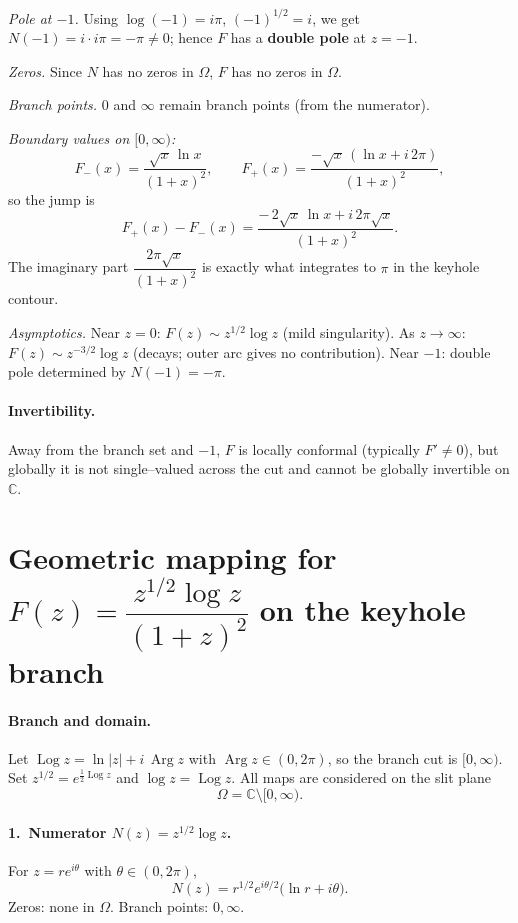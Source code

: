 \documentclass[12pt,a4paper]{article}
\DeclareMathOperator{\Arg}{Arg}
\DeclareMathOperator{\Log}{Log}
\newcommand{\C}{\mathbb{C}}
\begin{document}
\emph{Pole at \(-1\).}
Using \(\log(-1)=i\pi\), \((-1)^{1/2}=i\), we get \(N(-1)=i\cdot i\pi=-\pi\neq0\);
hence \(F\) has a \textbf{double pole} at \(z=-1\).

\emph{Zeros.}
Since \(N\) has no zeros in \(\Omega\), \(F\) has no zeros in \(\Omega\).

\emph{Branch points.}
\(0\) and \(\infty\) remain branch points (from the numerator).

\emph{Boundary values on \([0,\infty)\):}
\[
F_-(x)=\frac{\sqrt{x}\,\ln x}{(1+x)^2},\qquad
F_+(x)=\frac{-\sqrt{x}\,(\ln x+i\,2\pi)}{(1+x)^2},
\]
so the jump is
\[
F_+(x)-F_-(x)=\frac{-\,2\sqrt{x}\,\ln x+i\,2\pi\sqrt{x}}{(1+x)^2}.
\]
The imaginary part \( \dfrac{2\pi\sqrt{x}}{(1+x)^2}\) is exactly what integrates to \(\pi\) in the keyhole contour.

\emph{Asymptotics.}
Near \(z=0\): \(F(z)\sim z^{1/2}\log z\) (mild singularity).
As \(z\to\infty\): \(F(z)\sim z^{-3/2}\log z\) (decays; outer arc gives no contribution).
Near \(-1\): double pole determined by \(N(-1)=-\pi\).

\bigskip

\paragraph{Invertibility.}
Away from the branch set and \(-1\), \(F\) is locally conformal (typically \(F'\neq0\)),
but globally it is not single–valued across the cut and cannot be globally invertible on \(\C\).

\section*{Geometric mapping for \(F(z)=\dfrac{z^{1/2}\log z}{(1+z)^2}\) on the keyhole branch}

\paragraph{Branch and domain.}
Let \(\Log z=\ln|z|+i\,\Arg z\) with \(\Arg z\in(0,2\pi)\), so the branch cut is \([0,\infty)\).
Set \(z^{1/2}=e^{\frac12\Log z}\) and \(\log z=\Log z\).
All maps are considered on the slit plane
\[
\Omega=\C\setminus[0,\infty).
\]

\bigskip
\paragraph{1.\ Numerator \(N(z)=z^{1/2}\log z\).}
For \(z=re^{i\theta}\) with \(\theta\in(0,2\pi)\),
\[
N(z)=r^{1/2}e^{i\theta/2}\big(\ln r+i\theta\big).
\]
Zeros: none in \(\Omega\). Branch points: \(0,\infty\).
\end{document}
